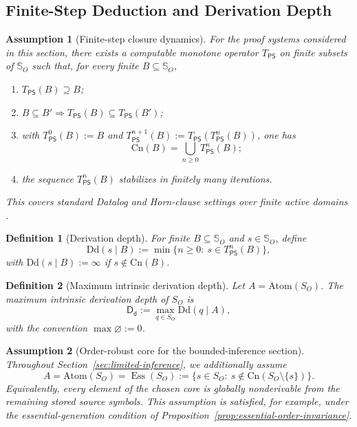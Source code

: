 \documentclass[journal,onecolumn]{IEEEtran}
\newcommand{\Dd}{\text{Dd}}
\newcommand{\Atom}{\text{Atom}}
\newcommand{\Cn}{\text{Cn}}
\newcommand{\Ess}{\operatorname{Ess}}
\newtheorem{assumption}{Assumption}[section]
\newtheorem{definition}{Definition}[section]
\numberwithin{equation}{section}
\begin{document}
\subsection{Finite-Step Deduction and Derivation Depth}
\label{subsec:limited-inference-model}

\begin{assumption}[Finite-step closure dynamics]
\label{assump:finite-step-closure}
For the proof systems considered in this section, there exists a
computable monotone operator \(T_{\mathsf{PS}}\) on finite subsets
of \(\mathbb{S}_O\) such that, for every finite
\(B\subseteq\mathbb{S}_O\),
\begin{enumerate}[label=\textup{(T\arabic*)}]
  \item \(T_{\mathsf{PS}}(B)\supseteq B\);
  \item \(B\subseteq B' \Rightarrow
        T_{\mathsf{PS}}(B)\subseteq T_{\mathsf{PS}}(B')\);
  \item with \(T_{\mathsf{PS}}^0(B):=B\) and
        \(T_{\mathsf{PS}}^{n+1}(B):=
        T_{\mathsf{PS}}(T_{\mathsf{PS}}^n(B))\),
        one has
        \[
          \Cn(B)=\bigcup_{n\ge 0}T_{\mathsf{PS}}^n(B);
        \]
  \item the sequence \(T_{\mathsf{PS}}^n(B)\) stabilizes in
        finitely many iterations.
\end{enumerate}
This covers standard Datalog and Horn-clause settings over finite
active domains
\cite{van1976semantics,ceri1989you,abiteboul1995foundations,
dantsin2001complexity}.
\end{assumption}

\begin{definition}[Derivation depth]
\label{def:derivation-depth}
For finite \(B\subseteq\mathbb{S}_O\) and \(s\in\mathbb{S}_O\),
define
\[
  \Dd(s\mid B)
  :=
  \min\{n\ge 0:\ s\in T_{\mathsf{PS}}^n(B)\},
\]
with \(\Dd(s\mid B):=\infty\) if \(s\notin\Cn(B)\).
\end{definition}

\begin{definition}[Maximum intrinsic derivation depth]
\label{def:max-depth}
Let \(A=\Atom(S_O)\).
The \emph{maximum intrinsic derivation depth} of \(S_O\) is
\[
  \mathsf{D_d}
  :=
  \max_{q\in S_O}\Dd(q\mid A),
\]
with the convention \(\max\varnothing:=0\).
\end{definition}

\begin{assumption}[Order-robust core for the bounded-inference section]
\label{assump:atom-equals-essential}
Throughout Section~\ref{sec:limited-inference}, we additionally assume
\[
  A=\Atom(S_O)=\Ess(S_O)
  :=
  \{s\in S_O:\ s\notin \Cn(S_O\setminus\{s\})\}.
\]
Equivalently, every element of the chosen core is globally
nonderivable from the remaining stored source symbols.
This assumption is satisfied, for example, under the
essential-generation condition of
Proposition~\ref{prop:essential-order-invariance}.
\end{assumption}
\end{document}
